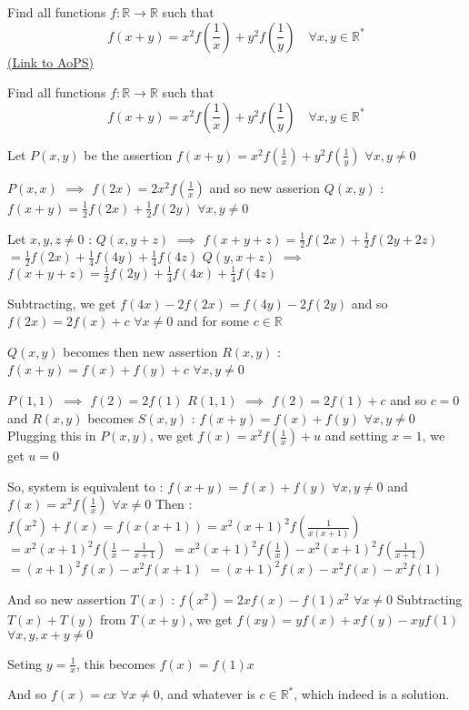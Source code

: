 \begin{problem}
	Find all functions $f:\mathbb{R}\to\mathbb{R}$ such that \[f(x+y)=x^2f(\frac{1}{x})+y^2f(\frac{1}{y}) \quad \forall x,y\in \mathbb{R}^*\]
	\flushright \href{https://artofproblemsolving.com/community/c6h559684}{(Link to AoPS)}
\end{problem}



\begin{solution}
	\begin{tcolorbox}Find all functions $f:\mathbb{R}\to\mathbb{R}$ such that \[f(x+y)=x^2f(\frac{1}{x})+y^2f(\frac{1}{y}) \quad \forall x,y\in \mathbb{R}^*\]\end{tcolorbox}
Let $P(x,y)$ be the assertion $f(x+y)=x^2f(\frac 1x)+y^2f(\frac 1y)$ $\forall x,y\ne 0$

$P(x,x)$ $\implies$ $f(2x)=2x^2f(\frac 1x)$ and so new asserion $Q(x,y)$ : $f(x+y)=\frac 12f(2x)+\frac 12f(2y)$ $\forall x,y\ne 0$

Let $x,y,z\ne 0$ : 
$Q(x,y+z)$ $\implies$ $f(x+y+z)=\frac 12f(2x)+\frac 12f(2y+2z)$ $=\frac 12f(2x)+\frac 14f(4y)+\frac 14f(4z)$
$Q(y,x+z)$ $\implies$ $f(x+y+z)=\frac 12f(2y)+\frac 14f(4x)+\frac 14f(4z)$

Subtracting, we get $f(4x)-2f(2x)=f(4y)-2f(2y)$ and so $f(2x)=2f(x)+c$ $\forall x\ne 0$ and for some $c\in\mathbb R$

$Q(x,y)$ becomes then new assertion $R(x,y)$ : $f(x+y)=f(x)+f(y)+c$ $\forall x,y\ne 0$

$P(1,1)$ $\implies$ $f(2)=2f(1)$
$R(1,1)$ $\implies$ $f(2)=2f(1)+c$ and so $c=0$ and $R(x,y)$ becomes $S(x,y)$ : $f(x+y)=f(x)+f(y)$ $\forall x,y\ne 0$
Plugging this in $P(x,y)$, we get $f(x)=x^2f(\frac 1x)+u$ and setting $x=1$, we get $u=0$

So, system is equivalent to :
$f(x+y)=f(x)+f(y)$ $\forall x,y\ne 0$ and $f(x)=x^2f(\frac 1x)$ $\forall x\ne 0$
Then :
$f(x^2)+f(x)=f(x(x+1))=x^2(x+1)^2f(\frac 1{x(x+1)})$ $=x^2(x+1)^2f(\frac 1x-\frac 1{x+1})$ $=x^2(x+1)^2f(\frac 1x)-x^2(x+1)^2f(\frac 1{x+1})$
$=(x+1)^2f(x)-x^2f(x+1)$ $=(x+1)^2f(x)-x^2f(x)-x^2f(1)$

And so new assertion $T(x)$ : $f(x^2)=2xf(x)-f(1)x^2$ $\forall x\ne 0$
Subtracting $T(x)+T(y)$ from $T(x+y)$, we get $f(xy)=yf(x)+xf(y)-xyf(1)$ $\forall x,y,x+y\ne 0$

Seting $y=\frac 1x$, this becomes $f(x)=f(1)x$

And so $\boxed{f(x)=cx}$ $\forall x\ne 0$, and whatever is $c\in\mathbb R^*$, which indeed is a solution.
\end{solution}



